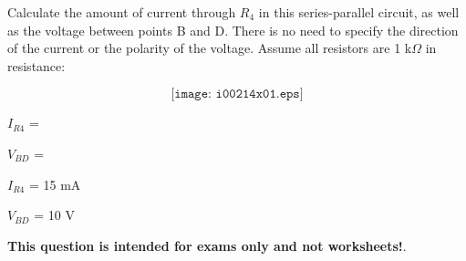 

Calculate the amount of current through $R_4$ in this series-parallel circuit, as well as the voltage between points B and D.  There is no need to specify the direction of the current or the polarity of the voltage.  Assume all resistors are 1 k$\Omega$ in resistance:

$$\texttt{[image: i00214x01.eps]}$$

$I_{R4}$ = 

\vskip 10pt

$V_{BD}$ = 

\vskip 10pt







$I_{R4}$ = 15 mA

\vskip 10pt

$V_{BD}$ = 10 V







{\bf This question is intended for exams only and not worksheets!}.



